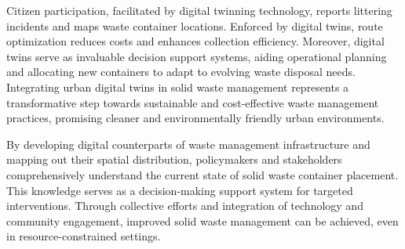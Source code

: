 \documentclass[authoryear,preprint,review,12pt]{elsarticle}
\begin{document}
    Citizen participation, facilitated by digital twinning technology, reports littering incidents and maps waste container locations. Enforced by digital twins, route optimization reduces costs and enhances collection efficiency. Moreover, digital twins serve as invaluable decision support systems, aiding operational planning and allocating new containers to adapt to evolving waste disposal needs. Integrating urban digital twins in solid waste management represents a transformative step towards sustainable and cost-effective waste management practices, promising cleaner and environmentally friendly urban environments.

    By developing digital counterparts of waste management infrastructure and mapping out their spatial distribution, policymakers and stakeholders comprehensively understand the current state of solid waste container placement. This knowledge serves as a decision-making support system for targeted interventions. Through collective efforts and integration of technology and community engagement, improved solid waste management can be achieved, even in resource-constrained settings.


     
    
    \appendix \label{appendix}
    
\end{document}

